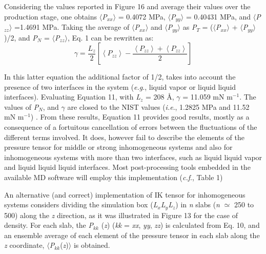 \documentclass{scrbook}
\begin{document}
Considering the values reported in Figure 16 and average their values over the production stage, one obtains ${\langle}$\textit{P}$_{xx}$${\rangle}$ = 0.4072 MPa, ${\langle}$\textit{P}$_{yy}$${\rangle}$  = 0.40431 MPa, and ${\langle}$\textit{P}$_{zz}$${\rangle}$ =1.4691 MPa. Taking the average of ${\langle}$\textit{P}$_{xx}$${\rangle}$ and  ${\langle}$\textit{P}$_{yy}$${\rangle}$ as \textit{P}$_{T}$ = (${\langle}$\textit{P}$_{xx}$${\rangle}$ + ${\langle}$\textit{P}$_{yy}$${\rangle}$)/2, and \textit{P}$_{N}$ = ${\langle}$\textit{P}$_{zz}$${\rangle}$, Eq. 1 can be rewritten as:
\begin{equation}
\gamma=\frac{L_{z}}{2}\left[\left\langle P_{zz}\right\rangle -\frac{\left\langle P_{zz}\right\rangle +\left\langle P_{zz}\right\rangle }{2}\right]
\end{equation}

In this latter equation the additional factor of 1/2, takes into account the
presence of  two interfaces in the system (\textit{e.g}., liquid \textendash{}
vapor or liquid \textendash{} liquid interfaces). Evaluating Equation 11, with
\textit{L}$_{z}$ = 208 \AA{}, ${\gamma}$ = 11.059 mN m$^{-1}$. The values of
\textit{P}$_{N}$, and ${\gamma}$ are closed to the NIST values (\textit{i.e}.,
1.2825 MPa and 11.52 mN m$^{-1}$) \citep{lemmon2013}. From these
results, Equation 11 provides good results, mostly as a consequence of
a fortuitous cancellation of errors between the fluctuations of the different
terms involved. It does, however fail to describe the elements of the pressure
tensor for middle or strong inhomogeneous systems and also for inhomogeneous
systems with more than two interfaces, such as liquid \textendash{} liquid
\textendash{} vapor and liquid \textendash{} liquid \textendash{} liquid
interfaces. Most post-processing tools embedded in the available MD software
will employ this implementation (\textit{c.f}., Table 1)

An alternative (and correct) implementation of IK tensor for inhomogeneous
systems considers dividing the simulation box
(\textit{L}$_{x}$\textit{L}$_{y}$\textit{L}$_{z}$) in \textit{n} slabs
(\textit{n} ${\simeq}$ 250 to 500) along the \textit{z} direction, as it was
illustrated in Figure 13 for the case of density. For each slab, the
\textit{P}$_{kk}$ (\textit{z}) (\textit{kk} = \textit{xx}, \textit{yy},
\textit{zz}) is calculated from Eq. 10, and an ensemble average of each element
of the pressure tensor in each slab along the \textit{z} coordinate,
${\langle}$\textit{P}$_{kk}$(\textit{z})${\rangle}$ is obtained. 
\end{document}
